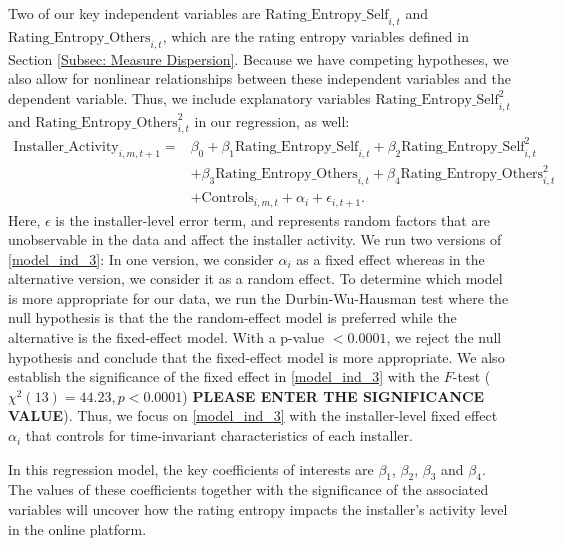 \documentclass[msom,blindrev]{informs3}
\begin{document}
 Two of our key independent variables are $\text{Rating\_Entropy\_Self}_{i,t}$ and  $\text{Rating\_Entropy\_Others}_{i,t}$, which are the rating entropy variables defined in Section \ref{Subsec: Measure Dispersion}. Because we have competing hypotheses, we also allow for nonlinear relationships between these independent variables and the dependent variable. Thus, we include explanatory variables $\text{Rating\_Entropy\_Self}_{i,t}^{2}$ and $\text{Rating\_Entropy\_Others}_{i,t}^{2}$ in our regression, as well:
\begin{align}  \nonumber
    \text{Installer\_Activity}_{i,m,t+1}=&\beta_{0}+\beta_{1} \text{Rating\_Entropy\_Self}_{i,t}+\beta_{2} \text{Rating\_Entropy\_Self}_{i,t}^ {2}
    \\ \nonumber
    &+\beta_{3} \text{Rating\_Entropy\_Others}_{i,t}  +\beta_{4}\text{Rating\_Entropy\_Others}_{i,t}^{2} \\ \label{model_ind_3}
    &+ \text{Controls}_{i,m,t}+ \alpha_{i} + \epsilon_{i,t+1}.
\end{align}
 Here, $\epsilon$ is the installer-level error term, and represents random factors that are unobservable in the data and affect the installer activity.  We run two versions of \eqref{model_ind_3}: In one version, we consider $\alpha_{i}$ as a fixed effect whereas in the alternative version, we consider it as a random effect. To determine which model is more appropriate for our data, we run the Durbin-Wu-Hausman test where the null hypothesis is that the the random-effect model is preferred while the alternative is the fixed-effect model. With a p-value $<0.0001$, we reject the null hypothesis and conclude that the fixed-effect model is more appropriate. We also establish the significance of the fixed effect in \eqref{model_ind_3} with the $F$-test ( $\chi^{2}(13)=44.23,p<0.0001$) \textbf{PLEASE ENTER THE SIGNIFICANCE VALUE}). Thus, we focus on \eqref{model_ind_3} with the installer-level fixed effect $\alpha_{i}$ that controls for time-invariant characteristics of each installer.

In this regression model, the key coefficients of interests are $\beta_{1}$, $\beta_{2}$, $\beta_{3}$ and $\beta_{4}$. The values of these coefficients together with the significance of the associated variables will uncover how the rating entropy impacts the installer's activity level in the online platform.
\end{document}
